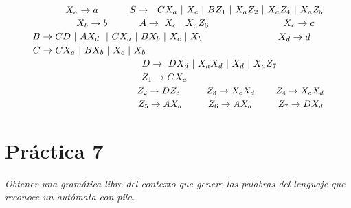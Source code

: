 $ \hspace*{2.2cm}X_a\rightarrow a $        $ \hspace*{1cm}S\rightarrow \  \ CX_a\  | \ X_c  \ | \ BZ_1\   |\ X_aZ_2\   |\ X_aZ_4\  |\ X_aZ_5\ $\newline
$ \hspace*{2.6cm}X_b\rightarrow b $        $ \hspace*{1cm}A\rightarrow \ X_c \  | \ X_aZ_6 $\newline
$ \hspace*{2.6cm}X_c\rightarrow c  $        $ \hspace*{1cm}B\rightarrow CD\  |\  AX_d  \ \  |\ CX_a\  |\ BX_b\  |\ X_c\  |\ X_b $\newline
$ \hspace*{2.6cm}X_d\rightarrow d $        $ \hspace*{1cm}C\rightarrow CX_a\  |\  BX_b \ |\ X_c \  |\ X_b $\newline
                                                                              $ \hspace*{5cm}D\rightarrow \ DX_d\ |\ X_aX_d\  |\ X_d \  | \ X_aZ_7$\newline
                                                                              $ \hspace*{5cm} Z_1\rightarrow CX_a\hspace{1cm}$ \newline
                                                                              $ \hspace*{5cm}Z_2\rightarrow DZ_3 \hspace{1cm} Z_3\rightarrow X_cX_d \hspace{0.8cm} Z_4\rightarrow X_cX_d\hspace{1cm}$ \newline
                                                                              $ \hspace*{5cm}Z_5\rightarrow AX_b\hspace{1cm} Z_6\rightarrow AX_b \hspace{1cm} Z_7\rightarrow DX_d\hspace{1cm}$ \newline
                                                                              
                                                                              
\section{Práctica 7}
\textit{Obtener una gramática libre del contexto que genere las palabras del lenguaje que reconoce un autómata con pila.}
\newline

